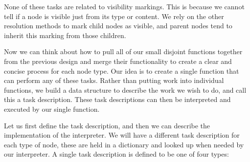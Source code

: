 \documentclass[twoside,a4paper]{report}
\begin{document}
None of these tasks are related to visibility markings. This is because we cannot tell if a node is visible just from its type or content. We rely on the
other resolution methods to mark child nodes as visible, and parent nodes tend to inherit this marking from those children.

Now we can think about how to pull all of our small disjoint functions together from the previous design and merge their functionality to create a clear and
concise process for each node type. Our idea is to create a single function that can perform any of these tasks. Rather than putting work into individual
functions, we build a data structure to describe the work we wish to do, and call this a task description. These task descriptions can then be interpreted and executed by
our single function.

Let us first define the task description, and then we can describe the implementation of the interpreter. We will have a different task description for each
type of node, these are held in a dictionary and looked up when needed by our interpreter. A single task description is defined to be one of four types:
\end{document}
